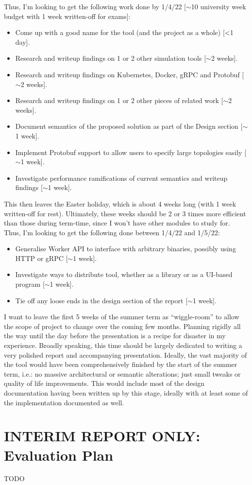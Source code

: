 Thus, I'm looking to get the following work done by 1/4/22 [$\sim$10 university week budget with 1 week written-off for
exams]:
\begin{itemize}
    \item Come up with a good name for the tool (and the project as a whole) [<1 day].
    \item Research and writeup findings on 1 or 2 other simulation tools [$\sim$2 weeks].
    \item Research and writeup findings on Kubernetes, Docker, gRPC and Protobuf [$\sim$2 weeks].
    \item Research and writeup findings on 1 or 2 other pieces of related work [$\sim$2 weeks].
    \item Document semantics of the proposed solution as part of the Design section [$\sim$1 week].
    \item Implement Protobuf support to allow users to specify large topologies easily [$\sim$1 week].
    \item Investigate performance ramifications of current semantics and writeup findings [$\sim$1 week].
\end{itemize}

This then leaves the Easter holiday, which is about 4 weeks long (with 1 week written-off for rest). Ultimately,
these weeks should be 2 or 3 times more efficient than those during term-time, since I won't have other modules to
study for. Thus, I'm looking to get the following done between 1/4/22 and 1/5/22:
\begin{itemize}
    \item Generalise Worker API to interface with arbitrary binaries, possibly using HTTP or gRPC [$\sim$1 week].
    \item Investigate ways to distribute tool, whether as a library or as a UI-based program [$\sim$1 week].
    \item Tie off any loose ends in the design section of the report [$\sim$1 week].
\end{itemize}

I want to leave the first 5 weeks of the summer term as ``wiggle-room'' to allow the scope of project to change over
the coming few months. Planning rigidly all the way until the day before the presentation is a recipe for disaster in my
experience. Broadly speaking, this time should be largely dedicated to writing a very polished report and accompanying
presentation. Ideally, the vast majority of the tool would have been comprehensively finished by the start of the summer
term, i.e.: no massive architectural or semantic alterations; just small tweaks or quality of life improvements. This
would include most of the design documentation having been written up by this stage, ideally with at least some of
the implementation documented as well.


\section{INTERIM REPORT ONLY: Evaluation Plan}

TODO
